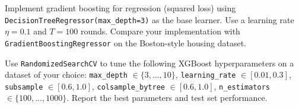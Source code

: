 \begin{exercise}
Implement gradient boosting for regression (squared loss) using \texttt{DecisionTreeRegressor(max\_depth=3)} as the base learner. Use a learning rate $\eta=0.1$ and $T=100$ rounds. Compare your implementation with \texttt{GradientBoostingRegressor} on the Boston-style housing dataset.
\end{exercise}

\begin{exercise}
Use \texttt{RandomizedSearchCV} to tune the following XGBoost hyperparameters on a dataset of your choice: \texttt{max\_depth} $\in\{3,\dots,10\}$, \texttt{learning\_rate} $\in[0.01,0.3]$, \texttt{subsample} $\in[0.6,1.0]$, \texttt{colsample\_bytree} $\in[0.6,1.0]$, \texttt{n\_estimators} $\in\{100,\dots,1000\}$. Report the best parameters and test set performance.
\end{exercise}
